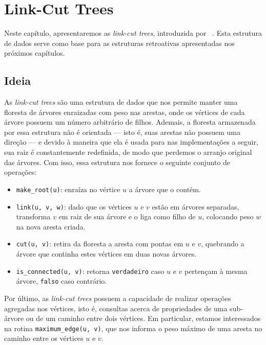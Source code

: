 
\chapter{Link-Cut Trees}
\label{cap:link-cut-trees}

Neste capítulo, apresentaremos as \emph{link-cut trees}, introduzida por ~\citet{10.1145/800076.802464}. Esta estrutura de dados serve como base para as estruturas retroativas apresentadas nos próximos capítulos.

\section{Ideia}
\label{sec:lct-ideia}

As \emph{link-cut trees} são uma estrutura de dados que nos permite manter uma floresta de árvores enraizadas com peso nas arestas, onde os vértices de cada árvore possuem um número arbitrário de filhos. Ademais, a floresta armazenada por essa estrutura não é orientada --- isto é, suas arestas não possuem uma direção --- e devido à maneira que ela é usada para nas implementações a seguir, sua raiz é constantemente redefinida, de modo que perdemos o arranjo original das árvores. Com isso, essa estrutura nos fornece o seguinte conjunto de operações:

\begin{itemize}
    \item \texttt{make\_root(u)}: enraíza no vértice $u$ a árvore que o contém.
    \item \texttt{link(u, v, w)}: dado que os vértices $u$ e $v$ estão em árvores separadas, transforma $v$ em raiz de sua árvore e o liga como filho de $u$, colocando peso $w$ na nova aresta criada.
    \item \texttt{cut(u, v)}: retira da floresta a aresta com pontas em $u$ e $v$, quebrando a árvore que continha estes vértices em duas novas árvores.
    \item \texttt{is\_connected(u, v)}: retorna \texttt{verdadeiro} caso $u$ e $v$ pertençam à mesma árvore, \texttt{falso} caso contrário.
\end{itemize}

Por último, as \emph{link-cut trees} possuem a capacidade de realizar operações agregadas nos vértices, isto é, consultas acerca de propriedades de uma sub-árvore ou de um caminho entre dois vértices. Em particular, estamos interessados na rotina \texttt{maximum\_edge(u, v)}, que nos informa o peso máximo de uma aresta no caminho entre os vértices $u$ e $v$.

